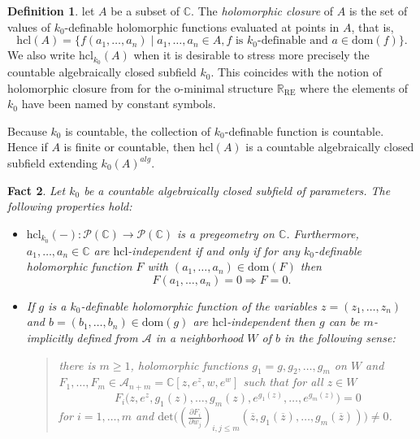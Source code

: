 \documentclass[12pt]{amsart}
\theoremstyle{definition}
\newtheorem{defn}{Definition}[section]
\theoremstyle{plain}
\newtheorem{fact}[defn]{Fact}
\theoremstyle{exampstyle}\newtheorem{thmx}{Theorem}
\theoremstyle{exampstyle}\newtheorem{thmxbis}{Theorem}
\begin{document}
\begin{defn} 
let $A$ be a subset of $\mathbb{C}$. The {\em holomorphic closure } of $A$ is the set of values of $k_0$-definable holomorphic functions evaluated at points in $A$, that is, 
$$ \mathrm{hcl}(A) = \lbrace f(a_1,\ldots,a_n) \mid a_1,\ldots,a_n \in A, f \text{ is } k_0\text{-definable and } a \in \mathrm{dom}(f) \rbrace.$$
We also write $\mathrm{hcl}_{k_0}(A)$ when it is desirable to stress more precisely the countable algebraically closed subfield $k_0$. This coincides with the notion of holomorphic closure from \cite{LGKJS, Jones-Kirby-Servi} for the o-minimal structure $\mathbb{R}_{\mathrm{RE}}$ where the elements of $k_0$ have been named by constant symbols.
\end{defn} 
Because $k_0$ is countable, the collection of $k_0$-definable function is countable. Hence if $A$ is finite or countable, then  $\mathrm{hcl}(A)$ is a countable algebraically closed subfield extending $k_0(A)^{alg}$.
\begin{fact} \label{fact-Wilkie-complete}
Let $k_0$ be a countable algebraically closed subfield of parameters.
The following properties hold:
\begin{itemize} 
\item[(a)] $\mathrm{hcl}_{k_0}(-): \mathcal P(\mathbb{C}) \rightarrow \mathcal P(\mathbb{C})$ is a pregeometry on $\mathbb{C}$. Furthermore, $a_1,\ldots,a_n \in \mathbb{C}$ are $\mathrm{hcl}$-independent if and only if for any $k_0$-definable holomorphic function $F$ with $(a_1,\ldots,a_n) \in \mathrm{dom}(F)$ then 
$$ F(a_1,\ldots,a_n) = 0 \Rightarrow F = 0.$$

\item[(b)] If $g$ is a $k_0$-definable holomorphic function of the variables $z = (z_1,\ldots, z_n)$ and $ b = (b_1,\ldots,b_n) \in \mathrm{dom}(g)$ are $\mathrm{hcl}$-independent then $g$ can be $m$-implicitly defined from $\mathcal A$ in a neighborhood $W$ of $b$ in the following sense: 

\begin{quote} 
there is $m \geq 1$, holomorphic functions $g_1 = g, g_2,\ldots,g_m$ on $W$ and $F_1,\ldots,F_m \in \mathcal A_{n + m} = \mathbb{C}[z,e^{z},w,e^{w}]$ such that for all $z \in W$ 
$$ F_i\Big(z,e^{z}, g_1(z), \ldots, g_m(z), e^{g_1(z)}, \ldots, e^{g_m(z)} \Big) = 0 $$
for $i = 1,\ldots, m$ and $\mathrm{det}\Big((\frac{\partial F_i} {\partial w_j})_{i,j \leq m}(\overline{z}, g_1(\overline{z}),\ldots, g_m(\overline{z})) \Big)\neq 0$.
\end{quote}
\end{itemize}
\end{fact}
\end{document}
